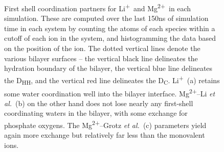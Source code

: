 \documentclass[journal=langd5,manuscript=article]{achemso}
\newcommand{\etal}{\textit{et al.}~}
\newcommand{\li}{Li\textsuperscript{+}~}
\newcommand{\mg}{Mg\textsuperscript{2+}~}
\newcommand{\mgmbnbfix}{Mg\textsuperscript{2+}--Li \etal} %
\newcommand{\mgmicro}{Mg\textsuperscript{2+}--Grotz \etal}
\begin{document}
\clearpage
\begin{figure}
    \caption{First shell coordination partners 
        for \li and \mg in each simulation. 
        These are computed over the last 150ns of 
        simulation time in each system by counting 
        the atoms of each species within a cutoff 
        of each ion in the system, and histogramming 
        the data based on the position of the ion. 
        The dotted vertical lines denote the various 
        bilayer surfaces -- the vertical black
        line delineates the hydration boundary of the bilayer,
        the vertical blue line delineates the D\textsubscript{HH},
        and the vertical red line delineates the D\textsubscript{C}.
        \li (a) retains some water 
        coordination well into the bilayer
        interface.
        \mgmbnbfix (b) on the other hand does not lose
        nearly any first-shell coordinating
        waters in the bilayer, with some exchange for phosphate
        oxygens. The \mgmicro (c) parameters yield again more exchange but 
        relatively far less than the monovalent
    ions.}
    \label{fig:cood}

\end{figure}
\end{document}

